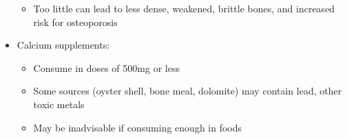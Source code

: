 \documentclass[12pt]{article}
\begin{document}
\begin{itemize}
\begin{itemize}
                        \item Too little can lead to less dense, weakened, brittle bones, and increased risk for osteoporosis
                    \end{itemize}
                \item Calcium supplements:
                    \begin{itemize}
                        \item Consume in doses of 500mg or less
                        \item Some sources (oyster shell, bone meal, dolomite) may contain lead, other toxic metals
                        \item May be inadvisable if consuming enough in foods
                    \end{itemize}
            \end{itemize}
        
\end{document}

